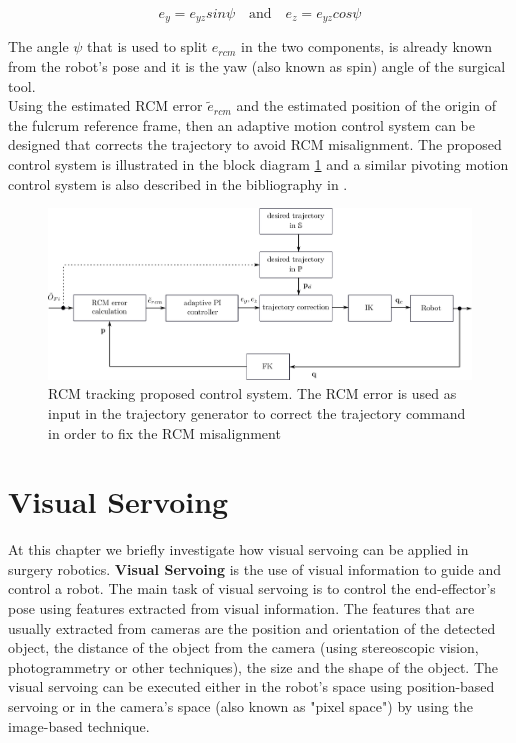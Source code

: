 \begin{equation}
e_y = e_{yz}sinψ \quad \textrm{and} \quad e_z = e_{yz}cosψ
\end{equation}

The angle $ψ$ that is used to split $e_{rcm}$ in the two components, is already known from the robot's pose and it is the yaw (also known as spin) angle of the surgical tool.\\

Using the estimated RCM error $\tilde{e}_{rcm}$ and the estimated position of the origin of the fulcrum reference frame, then an adaptive motion control system can be designed that corrects the trajectory to avoid RCM 
misalignment. The proposed control system is illustrated in the block diagram \ref{rcm-control-system-block-diagram} and a similar pivoting motion control system is also described in the bibliography 
in \cite{Muoz2005PivotingMC}.

\begin{center}
\begin{figure}[!htb]
\centering
\includegraphics[width=\textwidth]{images/rcm-system-control.png}
\caption{RCM tracking proposed control system. The RCM error is used as input in the trajectory generator to correct the trajectory command in order to fix the RCM misalignment}
\label{rcm-control-system-block-diagram}
\end{figure}
\end{center}


\section{Visual Servoing}

At this chapter we briefly investigate how visual servoing can be applied in surgery robotics. \textbf{Visual Servoing} is the use of visual information 
to guide and control a robot. The main task of visual servoing is to control the end-effector's pose using features extracted from visual information. The 
features that are usually extracted from cameras are the position and orientation of the detected object, the distance of the object from the camera (using 
stereoscopic vision, photogrammetry or other techniques), the size and the shape of the object. The visual servoing can be executed either in the robot's space 
using position-based servoing or in the camera's space (also known as "pixel space") by using the image-based technique.

